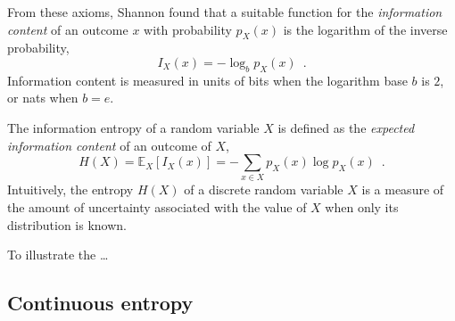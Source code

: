 From these axioms, Shannon found that a suitable function for the \emph{information content} of an outcome $x$ with probability $p_X(x)$ is the logarithm of the inverse probability,
%
\begin{equation}
    I_X(x) = -\log_b p_X(x) \enspace .
\end{equation}
%
Information content is measured in units of bits when the logarithm base $b$ is $2$, or nats when $b=e$. 

The information entropy of a random variable $X$ is defined as the \emph{expected information content} of an outcome of $X$,
%
\begin{equation}
    H(X) = \mathbb{E}_X\left[I_X(x)\right] = - \sum_{x\in X} p_X(x) \log p_X(x) \enspace .
\end{equation}
%
Intuitively, the entropy $H(X)$ of a discrete random variable $X$ is a measure of the amount of uncertainty associated with the value of $X$ when only its distribution is known. 

To illustrate the \dots {}

\subsection{Continuous entropy}










